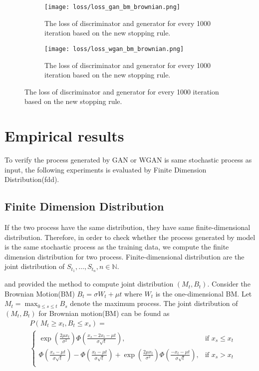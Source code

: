 \documentclass{article}
\begin{document}
	
	
	
	
	
	

	
	\begin{figure}[h]
		\begin{subfigure}[b]{0.5\textwidth}
			\texttt{[image: loss/loss\_gan\_bm\_brownian.png]}
			\caption{The loss of discriminator and generator for every 1000 iteration based on the new stopping rule.}
			\label{fig:loss_gan}
		\end{subfigure}
		\begin{subfigure}[b]{0.45\textwidth}
			\texttt{[image: loss/loss\_wgan\_bm\_brownian.png]}
			\caption{The loss of discriminator and generator for every 1000 iteration based on the new stopping rule.}
			\label{fig:loss_wgan}
		\end{subfigure}
	\end{figure}

		
	\section{Empirical results}
	
	To verify the process generated by GAN or WGAN is same stochastic process as input, the following experiments is evaluated by Finite Dimension Distribution(fdd).
	
	\subsection{Finite Dimension Distribution}
	
	If the two process have the same distribution, they have same finite-dimensional distribution.
	Therefore, in order to check whether the process generated by model is the same stochastic process as the training data, we compute the finite dimension distribution for two process.
	Finite-dimensional distribution are the joint distribution of $S_{t_{1}}, \dots, S_{t_{n}}, n \in \mathbb{N}$.
	
	\cite{chuang199681} and \cite{harrison1985} provided the method to compute joint distribution $(M_t, B_t)$. 
	Consider the Brownian Motion(BM) $B_t = \sigma W_t + \mu t$ where $W_t$ is the one-dimensional BM. 
	Let $M_t = \max_{0 \leq s \leq t}B_s$ denote the maximum process. The joint distribution of $(M_t, B_t)$ for Brownian motion(BM) can be found as {\small \begin{equation}
		\begin{aligned}
		&P(M_t \geq x_t, B_{t} \leq x_s) = \\
		&\left\{\begin{matrix}
		\exp\left(\frac{2\mu x_t}{\sigma^2}\right)\Phi\left(\frac{x_s- 2x_t -\mu t }{\sigma \sqrt{t}}\right), &\text{if $x_s \leq x_t$} \\
		\Phi\left(\frac{x_s-\mu t }{\sigma \sqrt{t}}\right) - \Phi\left(\frac{x_t -\mu t }{\sigma \sqrt{t}}\right) + \exp(\frac{2\mu x_t}{\sigma^2})\Phi\left(\frac{-x_t- \mu t }{\sigma \sqrt{t}}\right), &\text{if $x_s > x_t$} \\
		\end{matrix}
		\right.
		\end{aligned}
		\label{eq:joint_bm}
		\end{equation}}
	
\end{document}
